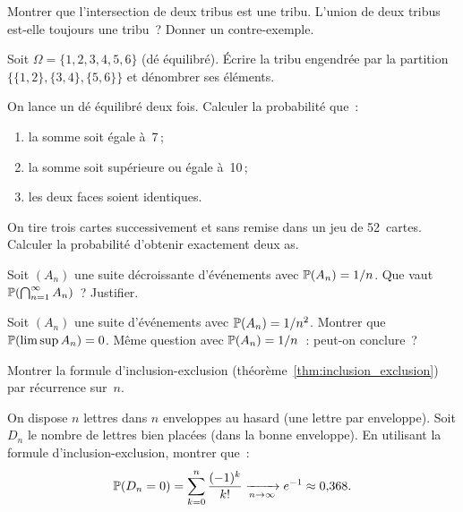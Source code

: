 \begin{exercice}
Montrer que l'intersection de deux tribus est une tribu. L'union de deux tribus
est-elle toujours une tribu~? Donner un contre-exemple.
\end{exercice}

\begin{exercice}
Soit $\Omega = \{1,2,3,4,5,6\}$ (d\'e \'equilibr\'e). \'Ecrire la tribu
engendr\'ee par la partition $\bigl\{\{1,2\}, \{3,4\}, \{5,6\}\bigr\}$ et
d\'enombrer ses \'el\'ements.
\end{exercice}

\begin{exercice}
On lance un d\'e \'equilibr\'e deux fois. Calculer la probabilit\'e que~:
\begin{enumerate}[label=(\alph*)]
    \item la somme soit \'egale \`a~7\,;
    \item la somme soit sup\'erieure ou \'egale \`a~10\,;
    \item les deux faces soient identiques.
\end{enumerate}
\end{exercice}

\begin{exercice}
On tire trois cartes successivement et sans remise dans un jeu de 52~cartes.
Calculer la probabilit\'e d'obtenir exactement deux as.
\end{exercice}

\begin{exercice}
Soit $(A_n)$ une suite d\'ecroissante d'\'ev\'enements avec
$\mathbb{P}(A_n) = 1/n$. Que vaut $\mathbb{P}(\bigcap_{n=1}^{\infty} A_n)$~? Justifier.
\end{exercice}

\begin{exercice}
Soit $(A_n)$ une suite d'\'ev\'enements avec $\mathbb{P}(A_n) = 1/n^2$.
Montrer que $\mathbb{P}(\limsup A_n) = 0$. M\^eme question avec $\mathbb{P}(A_n) = 1/n$~:
peut-on conclure~?
\end{exercice}

\begin{exercice}
Montrer la formule d'inclusion-exclusion (th\'eor\`eme~\ref{thm:inclusion_exclusion})
par r\'ecurrence sur~$n$.
\end{exercice}

\begin{exercice}
On dispose $n$ lettres dans $n$ enveloppes au hasard (une lettre par enveloppe).
Soit $D_n$ le nombre de lettres \og bien plac\'ees \fg (dans la bonne enveloppe).
En utilisant la formule d'inclusion-exclusion, montrer que~:
\[
    \mathbb{P}(D_n = 0) = \sum_{k=0}^{n} \frac{(-1)^k}{k!}
    \xrightarrow[n \to \infty]{} e^{-1} \approx 0{,}368.
\]
\end{exercice}
